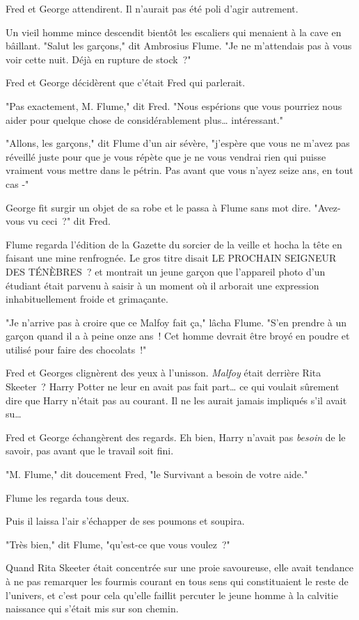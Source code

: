 Fred et George attendirent. Il n'aurait pas été poli d'agir autrement.

Un vieil homme mince descendit bientôt les escaliers qui menaient à la cave en bâillant. "Salut les garçons," dit Ambrosius Flume. "Je ne m'attendais pas à vous voir cette nuit. Déjà en rupture de stock~?"

Fred et George décidèrent que c'était Fred qui parlerait.

"Pas exactement, M. Flume," dit Fred. "Nous espérions que vous pourriez nous aider pour quelque chose de considérablement plus… intéressant."

"Allons, les garçons," dit Flume d'un air sévère, "j'espère que vous ne m'avez pas réveillé juste pour que je vous répète que je ne vous vendrai rien qui puisse vraiment vous mettre dans le pétrin. Pas avant que vous n'ayez seize ans, en tout cas -"

George fit surgir un objet de sa robe et le passa à Flume sans mot dire. "Avez-vous vu ceci~?" dit Fred.

Flume regarda l'édition de la Gazette du sorcier de la veille et hocha la tête en faisant une mine renfrognée. Le gros titre disait LE PROCHAIN SEIGNEUR DES TÉNÈBRES~? et montrait un jeune garçon que l'appareil photo d'un étudiant était parvenu à saisir à un moment où il arborait une expression inhabituellement froide et grimaçante.

"Je n'arrive pas à croire que ce Malfoy fait ça," lâcha Flume. "S'en prendre à un garçon quand il a à peine onze ans~! Cet homme devrait être broyé en poudre et utilisé pour faire des chocolats~!"

Fred et Georges clignèrent des yeux à l'unisson. \emph{Malfoy} était derrière Rita Skeeter~? Harry Potter ne leur en avait pas fait part… ce qui voulait sûrement dire que Harry n'était pas au courant. Il ne les aurait jamais impliqués s'il avait su…

Fred et George échangèrent des regards. Eh bien, Harry n'avait pas \emph{besoin} de le savoir, pas avant que le travail soit fini.

"M. Flume," dit doucement Fred, "le Survivant a besoin de votre aide."

Flume les regarda tous deux.

Puis il laissa l'air s'échapper de ses poumons et soupira.

"Très bien," dit Flume, "qu'est-ce que vous voulez~?"


Quand Rita Skeeter était concentrée sur une proie savoureuse, elle avait tendance à ne pas remarquer les fourmis courant en tous sens qui constituaient le reste de l'univers, et c'est pour cela qu'elle faillit percuter le jeune homme à la calvitie naissance qui s'était mis sur son chemin.

